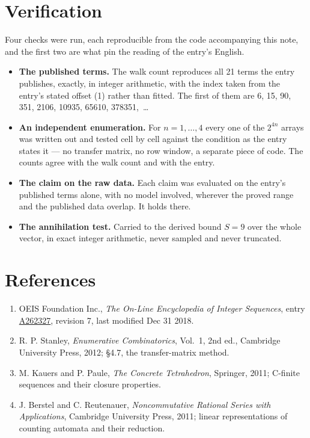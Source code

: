 \documentclass[11pt]{article}
\theoremstyle{definition}
\begin{document}
\section{Verification}

Four checks were run, each reproducible from the code accompanying this note, and the first two are what pin the reading of the entry's English.

\begin{itemize}

\item {\bfseries The published terms.} The walk count reproduces all 21 terms the entry publishes, exactly, in integer arithmetic, with the index taken from the entry's stated offset (1) rather than fitted. The first of them are 6, 15, 90, 351, 2106, 10935, 65610, 378351,~\dots

\item {\bfseries An independent enumeration.} For $n = 1,\dots,4$ every one of the $2^{4n}$ arrays was written out and tested cell by cell against the condition as the entry states it --- no transfer matrix, no row window, a separate piece of code. The counts agree with the walk count and with the entry.

\item {\bfseries The claim on the raw data.} Each claim was evaluated on the entry's published terms alone, with no model involved, wherever the proved range and the published data overlap. It holds there.

\item {\bfseries The annihilation test.} Carried to the derived bound $S = 9$ over the whole vector, in exact integer arithmetic, never sampled and never truncated.

\end{itemize}

\section{References}

\begin{enumerate}

\item OEIS Foundation Inc., \emph{The On-Line Encyclopedia of Integer Sequences}, entry \href{https://oeis.org/A262327}{A262327}, revision 7, last modified Dec 31 2018.

\item R. P. Stanley, \emph{Enumerative Combinatorics}, Vol.~1, 2nd ed., Cambridge University Press, 2012; \S4.7, the transfer-matrix method.

\item M. Kauers and P. Paule, \emph{The Concrete Tetrahedron}, Springer, 2011; C-finite sequences and their closure properties.

\item J. Berstel and C. Reutenauer, \emph{Noncommutative Rational Series with Applications}, Cambridge University Press, 2011; linear representations of counting automata and their reduction.

\end{enumerate}
\end{document}
